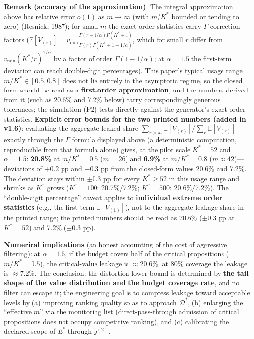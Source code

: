 \documentclass[
  11pt]{article}
\begin{document}
\textbf{Remark (accuracy of the approximation)}. The integral
approximation above has relative error \(o(1)\) as \(m \to \infty\)
(with \(m/K^*\) bounded or tending to zero) (Resnick, 1987); for small
\(m\) the exact order statistics carry \(\Gamma\) correction factors
(\(\mathbb{E}[V_{(r)}] = v_{\min}\frac{\Gamma(r-1/\alpha)\Gamma(K^*+1)}{\Gamma(r)\Gamma(K^*+1-1/\alpha)}\),
which for small \(r\) differ from \(v_{\min}(K^*/r)^{1/\alpha}\) by a
factor of order \(\Gamma(1-1/\alpha)\); at \(\alpha=1.5\) the first-term
deviation can reach double-digit percentages). This paper's typical
usage range \(m/K^* \in [0.5, 0.8]\) does not lie entirely in the
asymptotic regime, so the closed form should be read as a
\textbf{first-order approximation}, and the numbers derived from it
(such as 20.6\% and 7.2\% below) carry correspondingly generous
tolerances; the simulation (P2) tests directly against the generator's
exact order statistics. \textbf{Explicit error bounds for the two
printed numbers (added in v1.6)}: evaluating the aggregate leaked share
\(\sum_{r>m}\mathbb{E}[V_{(r)}]\big/\sum_{r}\mathbb{E}[V_{(r)}]\)
exactly through the \(\Gamma\) formula displayed above (a deterministic
computation, reproducible from that formula alone) gives, at the pilot
scale \(K^*=52\) and \(\alpha=1.5\): \textbf{20.8\%} at \(m/K^*=0.5\)
(\(m=26\)) and \textbf{6.9\%} at \(m/K^*=0.8\)
(\(m \approx 42\))---deviations of \(+0.2\) pp and \(-0.3\) pp from the
closed-form values 20.6\% and 7.2\%. The deviation stays within
\(\pm0.3\) pp for every \(K^* \ge 52\) in this usage range and shrinks
as \(K^*\) grows (\(K^*=100\): 20.7\%/7.2\%; \(K^*=500\): 20.6\%/7.2\%).
The ``double-digit percentage'' caveat applies to \textbf{individual
extreme order statistics} (e.g., the first term
\(\mathbb{E}[V_{(1)}]\)), not to the aggregate leakage share in the
printed range; the printed numbers should be read as 20.6\% (\(\pm0.3\)
pp at \(K^*=52\)) and 7.2\% (\(\pm0.3\) pp).

\textbf{Numerical implications} (an honest accounting of the cost of
aggressive filtering): at \(\alpha = 1.5\), if the budget covers half of
the critical propositions (\(m/K^* = 0.5\)), the critical-value leakage
is \(\approx 20.6\%\); at \(80\%\) coverage the leakage is
\(\approx 7.2\%\). The conclusion: the distortion lower bound is
determined by \textbf{the tail shape of the value distribution and the
budget coverage rate}, and no filter can escape it; the engineering goal
is to compress leakage toward acceptable levels by (a) improving ranking
quality so as to approach \(\mathcal{D}^*\), (b) enlarging the
``effective \(m\)'' via the monitoring list (direct-pass-through
admission of critical propositions does not occupy competitive ranking),
and (c) calibrating the declared scope of \(E^*\) through \(g^{(2)}\).
\end{document}
